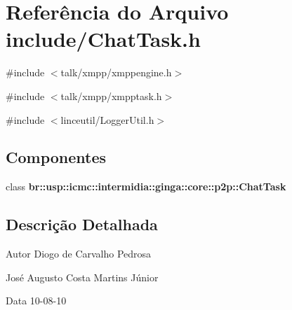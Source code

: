 \section{Referência do Arquivo include/ChatTask.h}
\label{ChatTask_8h}
{\ttfamily \#include $<$talk/xmpp/xmppengine.h$>$}\par
{\ttfamily \#include $<$talk/xmpp/xmpptask.h$>$}\par
{\ttfamily \#include $<$linceutil/LoggerUtil.h$>$}\par
\subsection*{Componentes}
\begin{DoxyCompactItemize}
\item 
class {\bf br::usp::icmc::intermidia::ginga::core::p2p::ChatTask}
\end{DoxyCompactItemize}


\subsection{Descrição Detalhada}
\begin{DoxyAuthor}{Autor}
Diogo de Carvalho Pedrosa 

José Augusto Costa Martins Júnior 
\end{DoxyAuthor}
\begin{DoxyDate}{Data}
10-\/08-\/10 
\end{DoxyDate}
